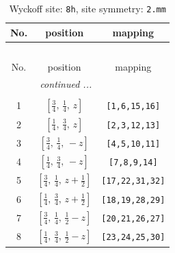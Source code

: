 \documentclass[fleqn,8pt]{jsarticle}
\begin{document}
\begin{longtable}{ccc}
\caption{Wyckoff site: {\tt 8h}, site symmetry: {\tt 2.mm}}
 \\
 \hline \hline
No. & position & mapping \\ \hline \endfirsthead

\multicolumn{2}{l}{\tablename\ \thetable{}} \\
 \hline \hline
No. & position & mapping \\ \hline \endhead

 \hline \hline
\multicolumn{2}{r}{\footnotesize\it continued ...} \\ \endfoot

 \hline \hline
\multicolumn{2}{r}{} \\ \endlastfoot

1 & $\left[ \frac{3}{4},\, \frac{1}{4},\, z \right]$ & {\tt [1,6,15,16]} \\ \hline
2 & $\left[ \frac{1}{4},\, \frac{3}{4},\, z \right]$ & {\tt [2,3,12,13]} \\ \hline
3 & $\left[ \frac{3}{4},\, \frac{1}{4},\, - z \right]$ & {\tt [4,5,10,11]} \\ \hline
4 & $\left[ \frac{1}{4},\, \frac{3}{4},\, - z \right]$ & {\tt [7,8,9,14]} \\ \hline
5 & $\left[ \frac{3}{4},\, \frac{1}{4},\, z + \frac{1}{2} \right]$ & {\tt [17,22,31,32]} \\ \hline
6 & $\left[ \frac{1}{4},\, \frac{3}{4},\, z + \frac{1}{2} \right]$ & {\tt [18,19,28,29]} \\ \hline
7 & $\left[ \frac{3}{4},\, \frac{1}{4},\, \frac{1}{2} - z \right]$ & {\tt [20,21,26,27]} \\ \hline
8 & $\left[ \frac{1}{4},\, \frac{3}{4},\, \frac{1}{2} - z \right]$ & {\tt [23,24,25,30]} \\
\end{longtable}
\renewcommand{\arraystretch}{1.2}
\end{document}
